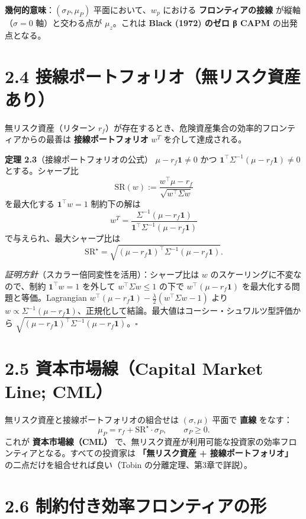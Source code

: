 \documentclass[11pt,a4paper]{report}
\begin{document}
\textbf{幾何的意味}：$(\sigma_P, \mu_P)$ 平面において、$w_p$ における \textbf{フロンティアの接線} が縦軸（$\sigma = 0$ 軸）と交わる点が $\mu_z$。これは \textbf{Black (1972) のゼロ β CAPM} の出発点となる。

\section{2.4 接線ポートフォリオ（無リスク資産あり）}

無リスク資産（リターン $r_f$）が存在するとき、危険資産集合の効率的フロンティアからの最善は \textbf{接線ポートフォリオ} $w^T$ を介して達成される。

\textbf{定理 2.3}（接線ポートフォリオの公式） $\mu - r_f \mathbf{1} \neq 0$ かつ $\mathbf{1}^\top \Sigma^{-1}(\mu - r_f \mathbf{1}) \neq 0$ とする。シャープ比 \[ \mathrm{SR}(w) := \frac{w^\top \mu - r_f}{\sqrt{w^\top \Sigma w}} \] を最大化する $\mathbf{1}^\top w = 1$ 制約下の解は \[ \boxed{\; w^T = \frac{\Sigma^{-1}(\mu - r_f \mathbf{1})}{\mathbf{1}^\top \Sigma^{-1}(\mu - r_f \mathbf{1})} \;} \] で与えられ、最大シャープ比は \[ \mathrm{SR}^\star = \sqrt{(\mu - r_f\mathbf{1})^\top \Sigma^{-1} (\mu - r_f\mathbf{1})}. \]

\emph{証明方針}（スカラー倍同変性を活用）：シャープ比は $w$ のスケーリングに不変なので、制約 $\mathbf{1}^\top w = 1$ を外して $w^\top\Sigma w \le 1$ の下で $w^\top(\mu - r_f \mathbf{1})$ を最大化する問題と等価。Lagrangian $w^\top(\mu - r_f\mathbf{1}) - \tfrac{\lambda}{2}(w^\top \Sigma w - 1)$ より $w \propto \Sigma^{-1}(\mu - r_f\mathbf{1})$、正規化して結論。最大値はコーシー・シュワルツ型評価から $\sqrt{(\mu-r_f\mathbf{1})^\top \Sigma^{-1}(\mu-r_f\mathbf{1})}$。$\square$

\section{2.5 資本市場線（Capital Market Line; CML）}

無リスク資産と接線ポートフォリオの組合せは $(\sigma, \mu)$ 平面で \textbf{直線} をなす： \[ \mu_P = r_f + \mathrm{SR}^\star \cdot \sigma_P, \qquad \sigma_P \ge 0. \] これが \textbf{資本市場線（CML）} で、無リスク資産が利用可能な投資家の効率フロンティアとなる。すべての投資家は \textbf{「無リスク資産 + 接線ポートフォリオ」} の二点だけを組合せれば良い（Tobin の分離定理、第3章で詳説）。

\section{2.6 制約付き効率フロンティアの形}
\end{document}
